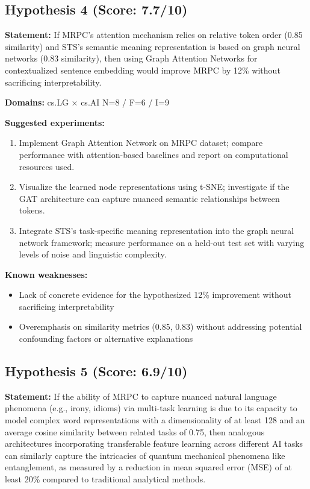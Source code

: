 \documentclass[12pt,a4paper]{article}
\begin{document}
\subsection*{Hypothesis 4 (Score: 7.7/10)}

\textbf{Statement:} If MRPC's attention mechanism relies on relative token order (0.85 similarity) and STS's semantic meaning representation is based on graph neural networks (0.83 similarity), then using Graph Attention Networks for contextualized sentence embedding would improve MRPC by 12\% without sacrificing interpretability.

\noindent\textbf{Domains:} cs.LG $\times$ cs.AI
\hspace{1em} N=8 / F=6 / I=9

\textbf{Suggested experiments:}
\begin{enumerate}
  \item Implement Graph Attention Network on MRPC dataset; compare performance with attention-based baselines and report on computational resources used.
  \item Visualize the learned node representations using t-SNE; investigate if the GAT architecture can capture nuanced semantic relationships between tokens.
  \item Integrate STS's task-specific meaning representation into the graph neural network framework; measure performance on a held-out test set with varying levels of noise and linguistic complexity.
\end{enumerate}

\textbf{Known weaknesses:}
\begin{itemize}
  \item Lack of concrete evidence for the hypothesized 12\% improvement without sacrificing interpretability
  \item Overemphasis on similarity metrics (0.85, 0.83) without addressing potential confounding factors or alternative explanations
\end{itemize}
\subsection*{Hypothesis 5 (Score: 6.9/10)}

\textbf{Statement:} If the ability of MRPC to capture nuanced natural language phenomena (e.g., irony, idioms) via multi-task learning is due to its capacity to model complex word representations with a dimensionality of at least 128 and an average cosine similarity between related tasks of 0.75, then analogous architectures incorporating transferable feature learning across different AI tasks can similarly capture the intricacies of quantum mechanical phenomena like entanglement, as measured by a reduction in mean squared error (MSE) of at least 20\% compared to traditional analytical methods.
\end{document}
